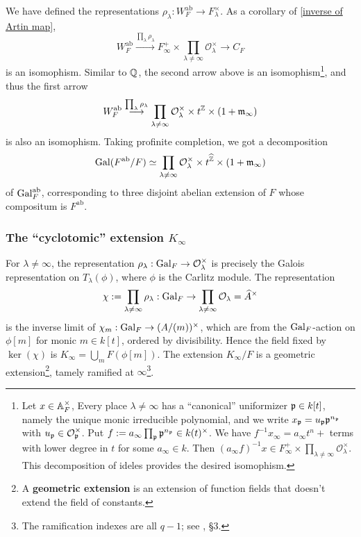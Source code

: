 \documentclass{article}
\renewcommand{\O}{\mathcal{O}}
\newcommand{\m}{\mathfrak{m}}
\newcommand{\ab}{\mathrm{ab}}
\begin{document}
We have defined the representations $\rho_\lambda : W_F^\ab\to F_\lambda^\times$.
As a corollary of \cref{inverse of Artin map},
\[W_F^\ab \stackrel{\prod_{\lambda}\rho_\lambda}{\longrightarrow} F_\infty^+\times\prod_{\lambda\ne\infty}\O_\lambda^\times\to C_F\]
is an isomophism.
Similar to $\mathbb{Q}$, the second arrow above is an isomophism\footnote{
Let $x\in \mathbb{A}_F^\times$,
Every place $\lambda\ne\infty$ has a ``canonical'' uniformizer $\mathfrak{p}\in k[t]$, namely the unique monic irreducible polynomial,
and we write $x_{\mathfrak{p}} = u_{\mathfrak{p}}\mathfrak{p}^{n_{\mathfrak{p}}}$ with $u_\p\in \O_\p^\times$.
Put $f := a_\infty\prod_{\mathfrak{p}}\mathfrak{p}^{n_{\mathfrak{p}}}\in k(t)^\times$.
We have $f^{-1}x_\infty = a_\infty t^{n} + {}$ terms with lower degree in $t$ for some $a_\infty\in k$.
Then $(a_\infty f)^{-1}x\in F_\infty^+\times\prod_{\lambda\ne\infty}\O_\lambda^\times$.
This decomposition of ideles provides the desired isomophism.
}, and thus the first arrow
\[W_F^\ab\stackrel{\prod_{\lambda}\rho_\lambda}{\longrightarrow} \prod_{\lambda\ne\infty}\O_\lambda^\times \times t^{\Z}\times (1 + \m_\infty)\]
is also an isomophism.
Taking profinite completion, we got a decomposition
\[\gal(F^\ab/F)
\simeq \prod_{\lambda\ne\infty}\O_\lambda^\times \times t^{\hat\Z}\times (1 + \m_\infty)\]
of $\gal_F^\ab$, corresponding to three disjoint abelian extension of $F$ whose compositum is $F^\ab$.

\subsubsection*{The ``cyclotomic'' extension \texorpdfstring{$K_\infty$}{K_infty}}
For $\lambda\ne\infty$, the representation $\rho_\lambda : \gal_F\to \O_\lambda^\times$ is precisely the Galois representation on $T_\lambda(\phi)$, where $\phi$ is the Carlitz module.
The representation \[\chi := \prod_{\lambda\ne\infty}\rho_\lambda : \gal_F\to \prod_{\lambda\ne\infty}\O_\lambda = \hat A^\times\]
is the inverse limit of $\chi_m : \operatorname{Gal}_F\to (A/(m))^\times$, which are from the $\operatorname{Gal}_F$-action on $\phi[m]$ for monic $m\in k[t]$, ordered by divisibility.
Hence the field fixed by $\ker(\chi)$ is $K_\infty = \bigcup_{m} F(\phi[m])$.
The extension $K_\infty/F$ is a geometric extension\footnote{A \textbf{geometric extension} is an extension of function fields that doesn't extend the field of constants.}, tamely ramified at $\infty$\footnote{
    The ramification indexes are all $q - 1$; see \cite{Ha74}, \S 3.
}.
\end{document}
